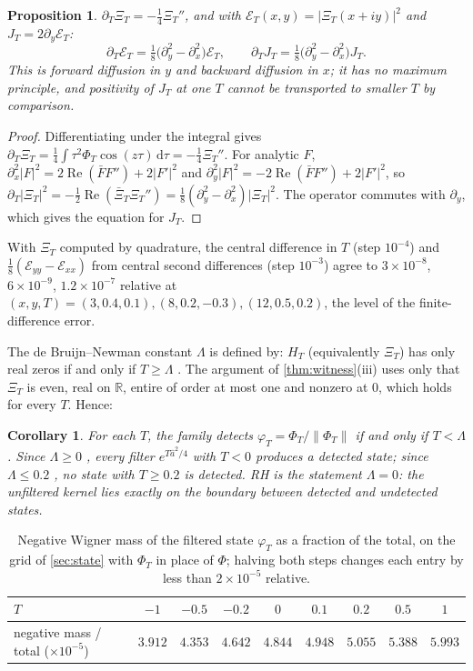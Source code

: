 \documentclass[11pt]{article}
\newtheorem{proposition}[theorem]{Proposition}
\newtheorem{corollary}[theorem]{Corollary}
\theoremstyle{definition}\newtheorem{definition}[theorem]{Definition}
\theoremstyle{remark}\newtheorem{remark}[theorem]{Remark}
\newcommand{\R}{\mathbb R}\newcommand{\C}{\mathbb C}\newcommand{\N}{\mathbb N}
\newcommand{\dd}{\,\mathrm d}\newcommand{\e}{\mathrm e}
\renewcommand{\Re}{\operatorname{Re}}\renewcommand{\Im}{\operatorname{Im}}
\begin{document}
\begin{proposition}\label{prop:flow}
$\partial_T\Xi_T=-\frac14\Xi_T''$, and with $\mathcal E_T(x,y)=|\Xi_T(x+iy)|^2$ and $J_T=2\partial_y\mathcal E_T$:
\[
\partial_T\mathcal E_T=\tfrac18\bigl(\partial_y^2-\partial_x^2\bigr)\mathcal E_T,\qquad\partial_TJ_T=\tfrac18\bigl(\partial_y^2-\partial_x^2\bigr)J_T .
\]
This is forward diffusion in $y$ and backward diffusion in $x$; it has no maximum principle, and positivity of $J_T$ at one $T$ cannot be transported to smaller $T$ by comparison.
\end{proposition}
\begin{proof}
Differentiating under the integral gives $\partial_T\Xi_T=\frac14\int\tau^2\Phi_T\cos(z\tau)\dd\tau=-\frac14\Xi_T''$. For analytic $F$, $\partial_x^2|F|^2=2\Re(\bar FF'')+2|F'|^2$ and $\partial_y^2|F|^2=-2\Re(\bar FF'')+2|F'|^2$, so $\partial_T|\Xi_T|^2=-\frac12\Re(\bar\Xi_T\Xi_T'')=\frac18(\partial_y^2-\partial_x^2)|\Xi_T|^2$. The operator commutes with $\partial_y$, which gives the equation for $J_T$.
\end{proof}
\noindent With $\Xi_T$ computed by quadrature, the central difference in $T$ (step $10^{-4}$) and $\frac18(\mathcal E_{yy}-\mathcal E_{xx})$ from central second differences (step $10^{-3}$) agree to $3\times10^{-8}$, $6\times10^{-9}$, $1.2\times10^{-7}$ relative at $(x,y,T)=(3,0.4,0.1),(8,0.2,-0.3),(12,0.5,0.2)$, the level of the finite-difference error.

The de Bruijn--Newman constant $\Lambda$ is defined by: $H_T$ (equivalently $\Xi_T$) has only real zeros if and only if $T\ge\Lambda$ \cite{deBruijn,Newman}. The argument of \cref{thm:witness}(iii) uses only that $\Xi_T$ is even, real on $\R$, entire of order at most one and nonzero at $0$, which holds for every $T$. Hence:

\begin{corollary}\label{cor:boundary}
For each $T$, the family detects $\varphi_T=\Phi_T/\|\Phi_T\|$ if and only if $T<\Lambda$. Since $\Lambda\ge0$ \cite{RT}, every filter $e^{T\hat a^2/4}$ with $T<0$ produces a detected state; since $\Lambda\le0.2$ \cite[Cor.~2]{PT}, no state with $T\ge0.2$ is detected. RH is the statement $\Lambda=0$: the unfiltered kernel lies exactly on the boundary between detected and undetected states.
\end{corollary}

\begin{table}[t]\centering\small
\begin{tabular}{@{}lcccccccc@{}}\toprule
$T$ & $-1$ & $-0.5$ & $-0.2$ & $0$ & $0.1$ & $0.2$ & $0.5$ & $1$\\\midrule
negative mass / total ($\times10^{-5}$) & $3.912$ & $4.353$ & $4.642$ & $4.844$ & $4.948$ & $5.055$ & $5.388$ & $5.993$\\\bottomrule
\end{tabular}
\caption{Negative Wigner mass of the filtered state $\varphi_T$ as a fraction of the total, on the grid of \cref{sec:state} with $\Phi_T$ in place of $\Phi$; halving both steps changes each entry by less than $2\times10^{-5}$ relative.}\label{tab:neg}
\end{table}
\end{document}

